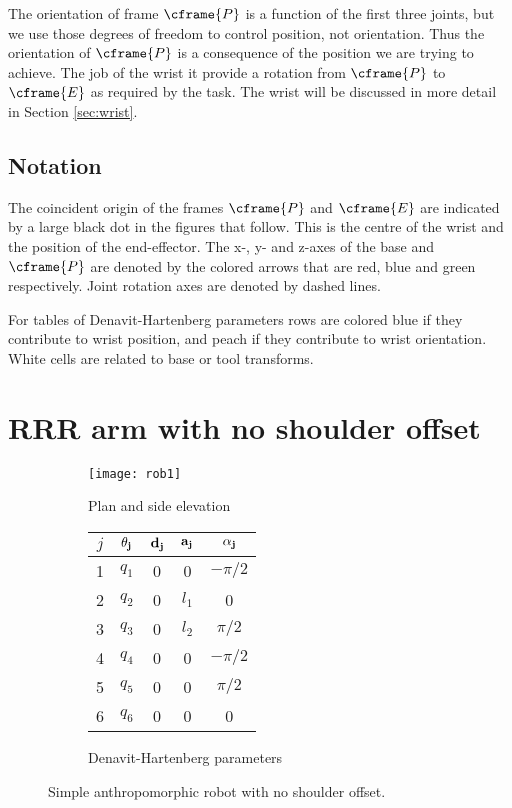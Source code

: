 \documentclass[11pt]{article}
\numberwithin{equation}{section}
\begin{document}
The orientation of frame $\cframe{P}$ is a function of the first three joints, but we use those degrees of freedom to control position, not orientation.  Thus the orientation of $\cframe{P}$ is a consequence of the position we are trying to achieve.  The job of the wrist it provide a rotation from
$\cframe{P}$ to $\cframe{E}$ as required by the task.  The wrist will be discussed in more
detail in Section \ref{sec:wrist}.


\subsection*{Notation}
The coincident origin of the frames
$\cframe{P}$ and $\cframe{E}$ are  indicated by a large black dot in the figures that follow.  This is the centre of the wrist and the position
of the end-effector.
The x-, y- and z-axes of the base and $\cframe{P}$ are denoted by the colored
arrows that are red, blue and green respectively.  Joint rotation axes are denoted by dashed lines.

For tables of Denavit-Hartenberg parameters rows are colored blue if they contribute to wrist position, and peach if they
contribute to wrist orientation.  White cells are related to base or tool transforms.

\tableofcontents
\pagebreak
\section{RRR arm with no shoulder offset}

	\begin{figure}[h]
	\centering
	\begin{subfigure}[b]{0.6\textwidth}
		\texttt{[image: rob1]}
		\caption{Plan and side elevation}
		\label{fig:rob1}
	\end{subfigure}
	\begin{subfigure}[b]{0.3\textwidth}
		\begin{tabular}{|c|c|c|c|c|} \hline
			$j$ & $\bf \theta_j$ & $\bf d_j$ & $\bf a_j$ & $\bf \alpha_j$ \\ \hline
			\rowcolor{SkyBlue}1 &  $q_1$ & \cellcolor{White} 0 &  0& $-\pi/2$ \\
			\rowcolor{SkyBlue}2 &  $q_2$ & 0& $l_1$& 0 \\
			\rowcolor{SkyBlue}3 & $q_3$ & 0 &$l_2$  & $\pi/2$ \\
			\rowcolor{Peach}4 &  $q_4$ & 0 & 0 & $-\pi/2$ \\
			\rowcolor{Peach}5&  $q_5$ & 0 & 0 & $\pi/2$ \\
			\cellcolor{Peach}6 &  \cellcolor{Peach} $q_6$ &0  &0  & 0 \\ \hline
		\end{tabular}
		\caption{Denavit-Hartenberg parameters}
		\label{fig:dh1}
	\end{subfigure}

	\caption{Simple anthropomorphic robot with no shoulder offset.  }
	\end{figure}
\end{document}
